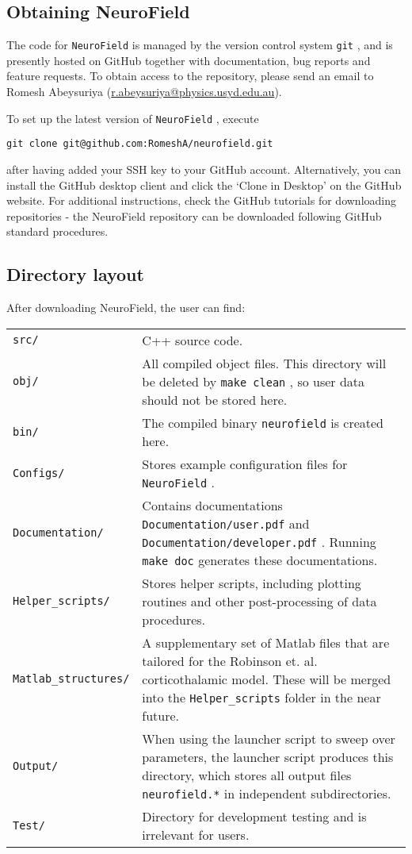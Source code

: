 \documentclass[12pt,a4paper]{article}
\newcommand{\type}[1]{ {\small\small\tt #1} }
\newcommand{\NF}[0]{ \type{NeuroField}}
\begin{document}
\subsection{Obtaining NeuroField}

The code for \NF is managed by the version control system \type{git}, and is presently hosted on GitHub together with documentation, bug reports and feature requests. To obtain access to the repository, please send an email to Romesh Abeysuriya (\url{r.abeysuriya@physics.usyd.edu.au}).

To set up the latest version of \NF, execute
\begin{lstlisting}
git clone git@github.com:RomeshA/neurofield.git
\end{lstlisting}
after having added your SSH key to your GitHub account. Alternatively, you can install the GitHub desktop client and click the `Clone in Desktop' on the GitHub website. For additional instructions, check the GitHub tutorials for downloading repositories - the NeuroField repository can be downloaded following GitHub standard procedures. 

\subsection{Directory layout}

After downloading NeuroField, the user can find:

\begin{tabular}{l p{14.4cm}}
\type{src/}& C++ source code.\\
\type{obj/}& All compiled object files. This directory will be deleted by \type{make clean}, so user data should not be stored here.\\
\type{bin/}& The compiled binary \type{neurofield} is created here.\\
\type{Configs/}& Stores example configuration files for \NF.\\
\type{Documentation/}& Contains documentations \type{Documentation/user.pdf} and \type{Documentation/developer.pdf}. Running \type{make doc} generates these documentations.\\
\type{Helper\_scripts/}& Stores helper scripts, including plotting routines and other post-processing of data procedures.\\
\type{Matlab\_structures/}& A supplementary set of Matlab files that are tailored for the Robinson et. al. corticothalamic model. These will be merged into the \type{Helper\_scripts} folder in the near future.\\
\type{Output/}& When using the launcher script to sweep over parameters, the launcher script produces this directory, which stores all output files \type{neurofield.*} in independent subdirectories.\\
\type{Test/}& Directory for development testing and is irrelevant for users.\\
\end{tabular}
\end{document}
